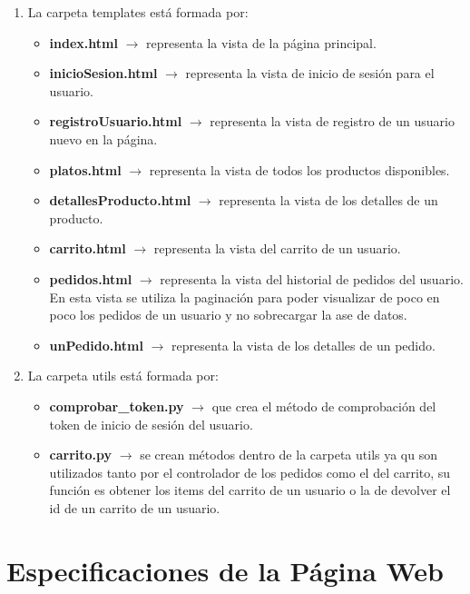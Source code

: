 \documentclass[10pt]{book}
\begin{document}
\begin{enumerate}
        \item La carpeta templates está formada por:
            \begin{itemize}
                \item \textbf{index.html} $\rightarrow$ representa la vista de la página principal.
                \item \textbf{inicioSesion.html} $\rightarrow$ representa la vista de inicio de sesión para el usuario.
                \item \textbf{registroUsuario.html} $\rightarrow$ representa la vista de registro de un usuario nuevo en la página.
                \item \textbf{platos.html} $\rightarrow$ representa la vista de todos los productos disponibles.
                \item \textbf{detallesProducto.html} $\rightarrow$ representa la vista de los detalles de un producto.
                \item \textbf{carrito.html} $\rightarrow$ representa la vista del carrito de un usuario.
                \item \textbf{pedidos.html} $\rightarrow$ representa la vista del historial de pedidos del usuario. En esta vista se utiliza la paginación para poder visualizar de poco en poco los pedidos de un usuario y no sobrecargar la ase de datos.
                \item \textbf{unPedido.html} $\rightarrow$ representa la vista de los detalles de un pedido.
            \end{itemize}

        \item La carpeta utils está formada por:
            \begin{itemize}
                \item \textbf{comprobar\_token.py} $\rightarrow$ que crea el método de comprobación del token de inicio de sesión del usuario.
                \item \textbf{carrito.py} $\rightarrow$ se crean métodos  dentro de la carpeta utils ya qu son utilizados tanto por el controlador de los pedidos como el del carrito, su función es obtener los items del carrito de un usuario o la de devolver el id de un carrito de un usuario.
            \end{itemize}
    \end{enumerate} 
        
\section{Especificaciones de la Página Web}
\end{document}
